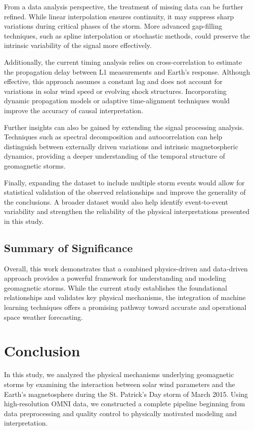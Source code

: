 \documentclass[12pt]{article}
\begin{document}
From a data analysis perspective, the treatment of missing data can be further refined. While linear interpolation ensures continuity, it may suppress sharp variations during critical phases of the storm. More advanced gap-filling techniques, such as spline interpolation or stochastic methods, could preserve the intrinsic variability of the signal more effectively.

Additionally, the current timing analysis relies on cross-correlation to estimate the propagation delay between L1 measurements and Earth’s response. Although effective, this approach assumes a constant lag and does not account for variations in solar wind speed or evolving shock structures. Incorporating dynamic propagation models or adaptive time-alignment techniques would improve the accuracy of causal interpretation.

Further insights can also be gained by extending the signal processing analysis. Techniques such as spectral decomposition and autocorrelation can help distinguish between externally driven variations and intrinsic magnetospheric dynamics, providing a deeper understanding of the temporal structure of geomagnetic storms.

Finally, expanding the dataset to include multiple storm events would allow for statistical validation of the observed relationships and improve the generality of the conclusions. A broader dataset would also help identify event-to-event variability and strengthen the reliability of the physical interpretations presented in this study.

\subsection{Summary of Significance}

Overall, this work demonstrates that a combined physics-driven and data-driven approach provides a powerful framework for understanding and modeling geomagnetic storms. While the current study establishes the foundational relationships and validates key physical mechanisms, the integration of machine learning techniques offers a promising pathway toward accurate and operational space weather forecasting.

\section{Conclusion}

In this study, we analyzed the physical mechanisms underlying geomagnetic storms by examining the interaction between solar wind parameters and the Earth's magnetosphere during the St. Patrick’s Day storm of March 2015. Using high-resolution OMNI data, we constructed a complete pipeline beginning from data preprocessing and quality control to physically motivated modeling and interpretation.
\end{document}
